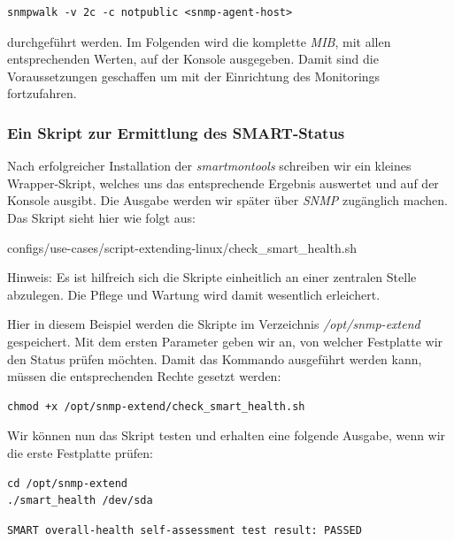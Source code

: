 \begin{lstlisting}[numbers=none]
snmpwalk -v 2c -c notpublic <snmp-agent-host>
\end{lstlisting}

durchgeführt werden. Im Folgenden wird die komplette \emph{MIB}, mit allen entsprechenden Werten, auf der Konsole ausgegeben. Damit sind die Voraussetzungen geschaffen um mit der Einrichtung des Monitorings fortzufahren.

\subsubsection{Ein Skript zur Ermittlung des SMART-Status}
Nach erfolgreicher Installation der \emph{smartmontools} schreiben wir ein kleines Wrapper-Skript, welches uns das entsprechende Ergebnis auswertet und auf der Konsole ausgibt. Die Ausgabe werden wir später über \emph{SNMP} zugänglich machen. Das Skript sieht hier wie folgt aus:


  {configs/use-cases/script-extending-linux/check_smart_health.sh}
  
Hinweis: Es ist hilfreich sich die Skripte einheitlich an einer zentralen Stelle abzulegen. Die Pflege und Wartung wird damit wesentlich erleichert. 

Hier in diesem Beispiel werden die Skripte im Verzeichnis \emph{/opt/snmp-extend} gespeichert. Mit dem ersten Parameter geben wir an, von welcher Festplatte wir den Status prüfen möchten. Damit das Kommando ausgeführt werden kann, müssen die entsprechenden Rechte gesetzt werden:

\begin{lstlisting}[numbers=none]
chmod +x /opt/snmp-extend/check_smart_health.sh
\end{lstlisting}

Wir können nun das Skript testen und erhalten eine folgende Ausgabe, wenn wir die erste Festplatte prüfen:

\begin{lstlisting}[numbers=none]
cd /opt/snmp-extend
./smart_health /dev/sda
\end{lstlisting}

\begin{lstlisting}[numbers=none]
SMART overall-health self-assessment test result: PASSED
\end{lstlisting}

